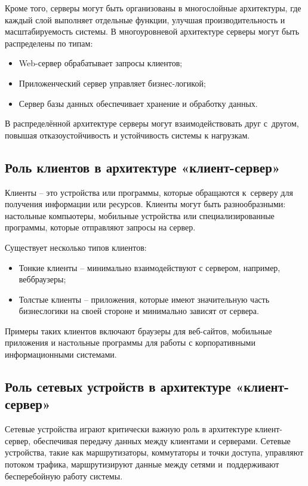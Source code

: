 \documentclass{ou}
\begin{document}
Кроме того, серверы могут быть организованы в многослойные архитектуры, где
каждый слой выполняет отдельные функции, улучшая производительность и
масштабируемость системы. В многоуровневой архитектуре серверы могут
быть распределены по типам:
\begin{itemize}[label=-, leftmargin=0em, itemindent=3.35em, nosep]
\item Web-сервер обрабатывает запросы клиентов;
\item Приложенческий сервер управляет бизнес-логикой;
\item Сервер базы данных обеспечивает хранение и обработку данных.
\end{itemize}

В распределённой архитектуре серверы могут взаимодействовать друг с~другом,
повышая отказоустойчивость и устойчивость системы к нагрузкам.
\subsection{Роль клиентов в архитектуре «клиент-сервер»}
Клиенты -- это устройства или программы, которые обращаются к~серверу для
получения информации или ресурсов. Клиенты могут быть разнообразными:
настольные компьютеры, мобильные устройства или специализированные
программы, которые отправляют запросы на сервер.

Существует несколько типов клиентов:
\begin{itemize}[label=-, leftmargin=0em, itemindent=3.35em, nosep]
\item Тонкие клиенты -- минимально взаимодействуют с сервером, например, веббраузеры;
\item Толстые клиенты -- приложения, которые имеют значительную часть бизнеслогики на своей стороне и минимально зависят от сервера.
\end{itemize}

Примеры таких клиентов включают браузеры для веб-сайтов, мобильные
приложения и настольные программы для работы с корпоративными
информационными системами.
\subsection{Роль сетевых устройств в архитектуре «клиент-сервер»}
Сетевые устройства играют критически важную роль в архитектуре клиент-сервер,
обеспечивая передачу данных между клиентами и серверами. Сетевые
устройства, такие как маршрутизаторы, коммутаторы и точки доступа, управляют
потоком трафика, маршрутизируют данные между сетями и~поддерживают
бесперебойную работу системы.
\end{document}
